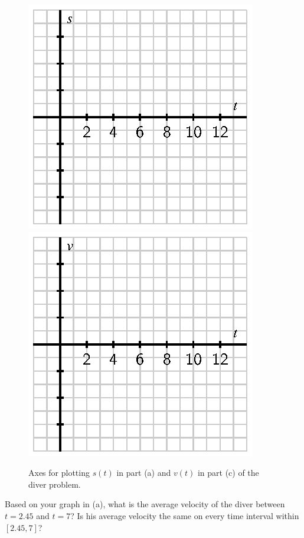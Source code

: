\begin{exercises}
\begin{figure}[h]
  \begin{center}
 \includegraphics{figures/1_1_Ez2a.eps} \ \  \includegraphics{figures/1_1_Ez2b.eps}
   \end{center}
   \caption{Axes for plotting $s(t)$ in part (a) and $v(t)$ in part (c) of the diver problem.} \label{F:1.1.Ez2}
\end{figure}

  \item Based on your graph in (a), what is the average velocity of the diver between $t = 2.45$ and $t=7$?  Is his average velocity the same on every time interval within $[2.45,7]$? 


\end{exercises}
